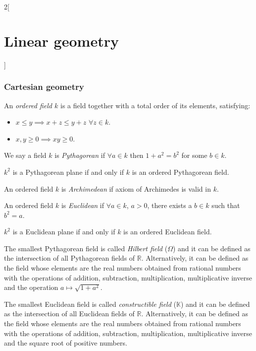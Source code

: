 \documentclass[class=article,10pt,crop=false]{standalone}
\begin{document}
\begin{multicols}{2}[\section{Linear geometry}]
\subsubsection{Cartesian geometry}
\begin{definition}
An \textit{ordered field $k$} is a field together with a total order of its elements, satisfying:
\begin{itemize}
    \item $x\leq y\implies x+z\leq y+z$ $\forall z\in k$.
    \item $x,y\geq 0\implies xy\geq 0$.
\end{itemize}
\end{definition}
\begin{definition}
We say a field $k$ is \textit{Pythagorean} if $\forall a\in k$ then $1+a^2=b^2$ for some $b\in k$.
\end{definition}
\begin{theorem}
$k^2$ is a Pythagorean plane if and only if $k$ is an ordered Pythagorean field.
\end{theorem}
\begin{definition}
An ordered field $k$ is \textit{Archimedean} if axiom of Archimedes is valid in $k$.
\end{definition}
\begin{definition}
An ordered field $k$ is \textit{Euclidean} if $\forall a\in k$, $a>0$, there exists a $b\in k$ such that $b^2=a$.
\end{definition}
\begin{theorem}
$k^2$ is a Euclidean plane if and only if $k$ is an ordered Euclidean field.
\end{theorem}
\begin{definition}
The smallest Pythagorean field is called \textit{Hilbert field} ($\Omega$) and it can be defined as the intersection of all Pythagorean fields of $\mathbb{R}$. Alternatively, it can be defined as the field whose elements are the real numbers obtained from rational numbers with the operations of addition, subtraction, multiplication, multiplicative inverse and the operation $a\mapsto\sqrt{1+a^2}$.
\end{definition}
\begin{definition}
The smallest Euclidean field is called \textit{constructible field} ($\mathbb{K}$) and it can be defined as the intersection of all Euclidean fields of $\mathbb{R}$. Alternatively, it can be defined as the field whose elements are the real numbers obtained from rational numbers with the operations of addition, subtraction, multiplication, multiplicative inverse and the square root of positive numbers.
\end{definition}

\end{multicols}
\end{document}
